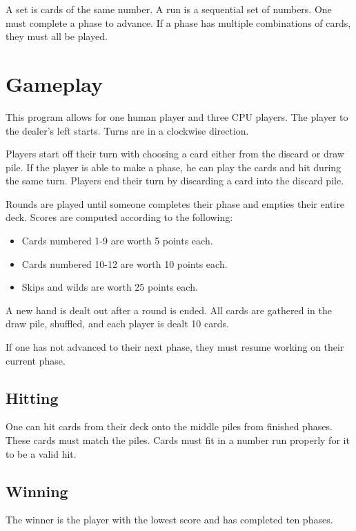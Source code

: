 \documentclass[12pt]{article}
\begin{document}
A set is cards of the same number. A run is a sequential set of numbers.
One must complete a phase to advance. If a phase has multiple combinations of cards, they
must all be played.

\section{Gameplay}
This program allows for one human player and three CPU players.
The player to the dealer's left starts. Turns are in a clockwise direction.

Players start off their turn with choosing a card either from the discard or draw pile.
If the player is able to make a phase, he can play the cards and hit during the same
turn. Players end their turn by discarding a card into the discard pile.

Rounds are played until someone completes their phase and empties their entire deck.
Scores are computed according to the following:

\begin{itemize}
	\item Cards numbered 1-9 are worth 5 points each.
	\item Cards numbered 10-12 are worth 10 points each.
	\item Skips and wilds are worth 25 points each.
\end{itemize}

A new hand is dealt out after a round is ended. All cards are gathered in the draw pile,
shuffled, and each player is dealt 10 cards.

If one has not advanced to their next phase, they must resume working on their current
phase.

\subsection{Hitting}
One can hit cards from their deck onto the middle piles from finished phases. These cards
must match the piles. Cards must fit in a number run properly for it to be a valid hit.

\subsection{Winning}
The winner is the player with the lowest score and has completed ten phases.
\end{document}
